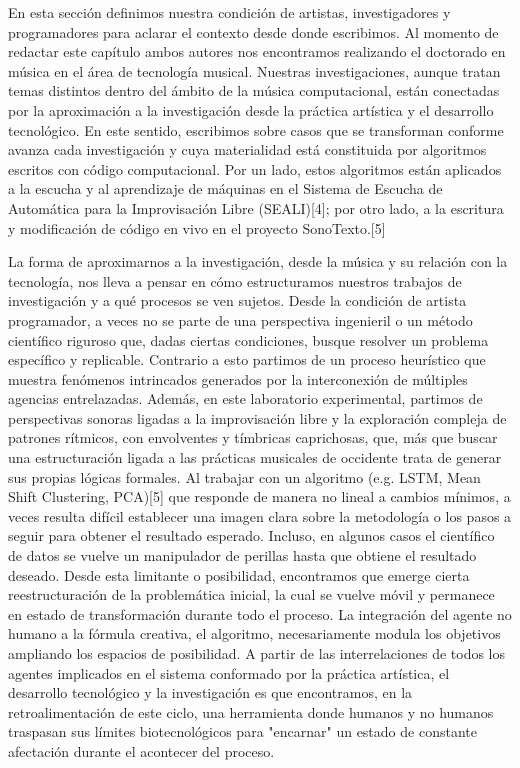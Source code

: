 En esta sección definimos nuestra condición de artistas, investigadores y programadores para aclarar el contexto desde donde escribimos. Al momento de redactar este capítulo ambos autores nos encontramos realizando el doctorado en música en el área de tecnología musical. Nuestras investigaciones, aunque tratan temas distintos dentro del ámbito de la música computacional, están conectadas por la aproximación a la investigación desde la práctica artística y el desarrollo tecnológico. En este sentido, escribimos sobre casos que se transforman conforme avanza cada investigación y cuya materialidad está constituida por algoritmos escritos con código computacional. Por un lado, estos algoritmos están aplicados a la escucha y al aprendizaje de máquinas en el Sistema de Escucha de Automática para la Improvisación Libre (SEALI)[4]; por otro lado, a la escritura y modificación de código en vivo en el proyecto SonoTexto.[5]

La forma de aproximarnos a la investigación, desde la música y su relación con la tecnología, nos lleva a pensar en cómo estructuramos nuestros trabajos de investigación y a qué procesos se ven sujetos. Desde la condición de artista programador, a veces no se parte de una perspectiva ingenieril o un método científico riguroso que, dadas ciertas condiciones, busque resolver un problema específico y replicable. Contrario a esto partimos de un proceso heurístico que muestra fenómenos intrincados generados por la interconexión de múltiples agencias entrelazadas. Además, en este laboratorio experimental, partimos de perspectivas sonoras ligadas a la improvisación libre y la exploración compleja de patrones rítmicos, con envolventes y tímbricas caprichosas, que, más que buscar una estructuración ligada a las prácticas musicales de occidente trata de generar sus propias lógicas formales. Al trabajar con un algoritmo (e.g. LSTM, Mean Shift Clustering, PCA)[5] que responde de manera no lineal a cambios mínimos, a veces resulta difícil establecer una imagen clara sobre la metodología o los pasos a seguir para obtener el resultado esperado. Incluso, en algunos casos el científico de datos se vuelve un manipulador de perillas hasta que obtiene el resultado deseado. Desde esta limitante o posibilidad, encontramos que emerge cierta reestructuración de la problemática inicial, la cual se vuelve móvil y permanece en estado de transformación durante todo el proceso. La integración del agente no humano a la fórmula creativa, el algoritmo, necesariamente modula los objetivos ampliando los espacios de posibilidad. A partir de las interrelaciones de todos los agentes implicados en el sistema conformado por la práctica artística, el desarrollo tecnológico y la investigación es que encontramos, en la retroalimentación de este ciclo, una herramienta donde humanos y no humanos traspasan sus límites biotecnológicos para "encarnar" un estado de constante afectación durante el acontecer del proceso. 

